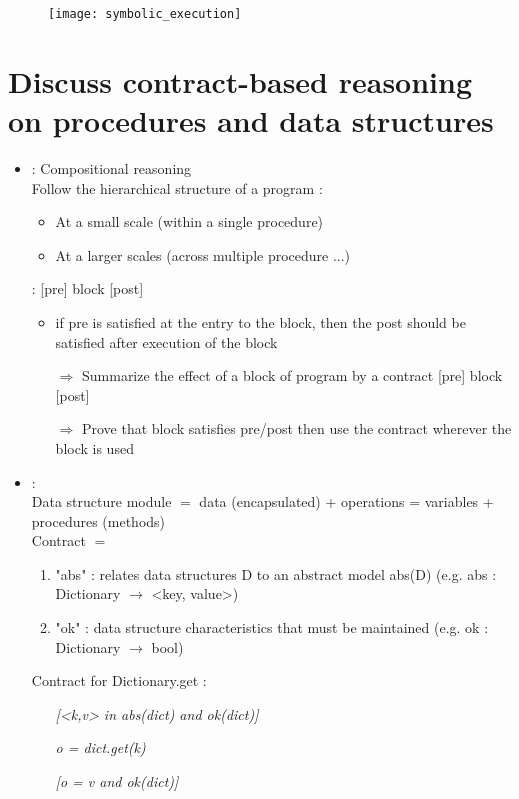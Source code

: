 \begin{figure}[H]
    \centering
    \texttt{[image: symbolic\_execution]}
\end{figure}

\section{Discuss contract-based reasoning on procedures and data structures}

\begin{itemize}
    \item {} : Compositional reasoning\\
    Follow the hierarchical structure of a program :
    \begin{itemize}
        \item At a small scale (within a single procedure)
        \item At a larger scales (across multiple procedure ...)
    \end{itemize}
     : [pre] block [post]
    \begin{itemize}
        \item  if pre is satisfied at the entry to the block, then the post should be satisfied after execution of the block
        \item[$\Rightarrow$] Summarize the effect of a block of program by a contract [pre] block [post]
        \item[$\Rightarrow$] Prove that block satisfies pre/post then use the contract wherever the block is used
    \end{itemize}

    \item {} :\\
    Data structure module $=$ data (encapsulated) + operations = variables + procedures (methods)\\
    Contract $=$ 
    \begin{enumerate}
        \item {} "abs" : relates data structures D to an abstract model abs(D) (e.g. abs : Dictionary $\rightarrow$ {<key, value>})
        \item {} "ok" : data structure characteristics that must be maintained (e.g. ok : Dictionary $\rightarrow$ bool)
    \end{enumerate}
    Contract for Dictionary.get :
    \begin{itemize}
        \item[] \textit{{[<k,v> in abs(dict) and ok(dict)]}}
        \item[] \textit{o = dict.get(k)}
        \item[] \textit{{[o = v and ok(dict)]}}
    \end{itemize}
\end{itemize}

